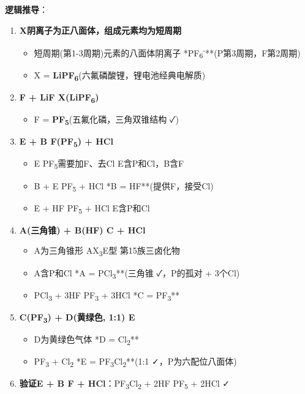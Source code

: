 \textbf{逻辑推导}：

\begin{enumerate}
\def\labelenumi{\arabic{enumi}.}
\tightlist
\item
  \textbf{X阴离子为正八面体，组成元素均为短周期}

  \begin{itemize}
  \tightlist
  \item
    短周期(第1-3周期)元素的八面体阴离子 \箭 **PF\textsubscript{6}\textsuperscript{-}**(P第3周期，F第2周期)
  \item
    X = \textbf{LiPF\textsubscript{6}}(六氟磷酸锂，锂电池经典电解质)
  \end{itemize}
\item
  \textbf{F + LiF \箭 X(LiPF\textsubscript{6})}

  \begin{itemize}
  \tightlist
  \item
    F = \textbf{PF\textsubscript{5}}(五氟化磷，三角双锥结构 ✓)
  \end{itemize}
\item
  \textbf{E + B \箭 F(PF\textsubscript{5}) + HCl}

  \begin{itemize}
  \tightlist
  \item
    E \箭 PF\textsubscript{5}需要加F、去Cl \箭 E含P和Cl，B含F
  \item
    B + E \箭 PF\textsubscript{5} + HCl \箭 **B = HF**(提供F，接受Cl)
  \item
    E + HF \箭 PF\textsubscript{5} + HCl \箭 E含P和Cl
  \end{itemize}
\item
  \textbf{A(三角锥) + B(HF) \箭 C + HCl}

  \begin{itemize}
  \tightlist
  \item
    A为三角锥形 \箭 AX\textsubscript{3}E型 \箭 第15族三卤化物
  \item
    A含P和Cl \箭 **A = PCl\textsubscript{3}**(三角锥 ✓，P的孤对 + 3个Cl)
  \item
    PCl\textsubscript{3} + 3HF \箭 PF\textsubscript{3} + 3HCl \箭 **C = PF\textsubscript{3}**
  \end{itemize}
\item
  \textbf{C(PF\textsubscript{3}) + D(黄绿色, 1:1) \箭 E}

  \begin{itemize}
  \tightlist
  \item
    D为黄绿色气体 \箭 **D = Cl\textsubscript{2}**
  \item
    PF\textsubscript{3} + Cl\textsubscript{2} \箭 **E = PF\textsubscript{3}Cl\textsubscript{2}**(1:1 ✓，P为六配位八面体)
  \end{itemize}
\item
  \textbf{验证E + B \箭 F + HCl}：PF\textsubscript{3}Cl\textsubscript{2} + 2HF \箭 PF\textsubscript{5} + 2HCl ✓
\end{enumerate}

